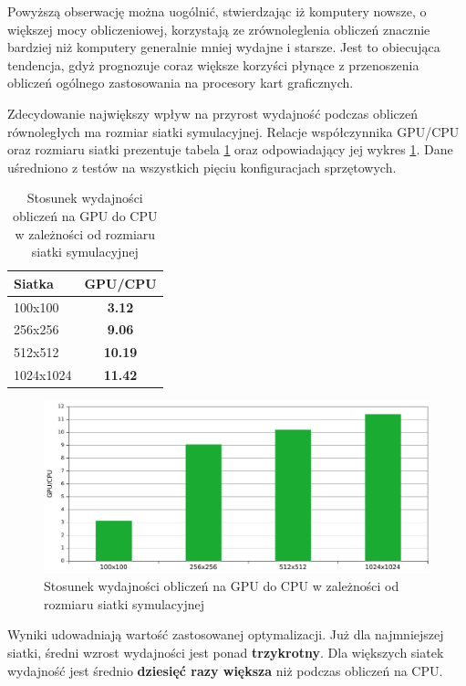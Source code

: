 Powyższą obserwację można uogólnić, stwierdzając iż komputery nowsze, o większej
mocy obliczeniowej, korzystają ze zrównoleglenia obliczeń znacznie bardziej niż
komputery generalnie mniej wydajne i starsze. Jest to obiecująca tendencja, gdyż
prognozuje coraz większe korzyści płynące z przenoszenia obliczeń ogólnego
zastosowania na procesory kart graficznych.

Zdecydowanie największy wpływ na przyrost wydajność podczas obliczeń
równoległych ma rozmiar siatki symulacyjnej. Relacje współczynnika GPU/CPU oraz
rozmiaru siatki prezentuje tabela \ref{tab:gpucpu} oraz odpowiadający jej wykres
\ref{fig:gpucpu}. Dane uśredniono z testów na wszystkich pięciu konfiguracjach
sprzętowych.

\begin{table}[!htp]
\caption{Stosunek wydajności obliczeń na GPU do CPU w zależności od rozmiaru
siatki symulacyjnej}
\centering
\begin{tabular}{|l|>{\bfseries}c|}
\hline
\cellcolor{t} Siatka & \cellcolor{gc} GPU/CPU \\ \hline
100x100 & 3.12 \\ \hline
256x256	& 9.06 \\ \hline
512x512	& 10.19 \\ \hline
1024x1024 & 11.42 \\ \hline
\end{tabular}
\label{tab:gpucpu}
\end{table}

\begin{figure}[!h]
\centering
\includegraphics[width=\textwidth]{img/gpucpu}
\caption{Stosunek wydajności obliczeń na GPU do CPU w zależności od rozmiaru
siatki symulacyjnej}
\label{fig:gpucpu}
\end{figure}

Wyniki udowadniają wartość zastosowanej optymalizacji. Już dla najmniejszej
siatki, średni wzrost wydajności jest ponad \textbf{trzykrotny}. Dla większych
siatek wydajność jest średnio \textbf{dziesięć razy większa} niż podczas
obliczeń na CPU.

